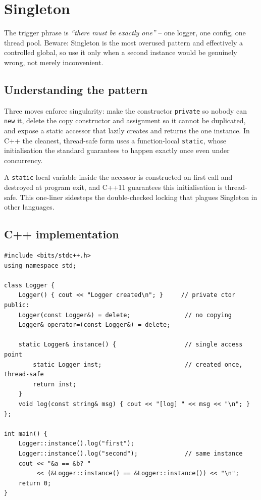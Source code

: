 \section{Singleton}
\label{sec:pat-singleton}


\begin{patternbox}
The trigger phrase is \emph{``there must be exactly one''} -- one logger,
one config, one thread pool. Beware: Singleton is the most overused
pattern and effectively a controlled global, so use it only when a second
instance would be genuinely wrong, not merely inconvenient.
\end{patternbox}

\subsection*{Understanding the pattern}

Three moves enforce singularity: make the constructor \texttt{private} so
nobody can \texttt{new} it, delete the copy constructor and assignment so
it cannot be duplicated, and expose a static accessor that lazily creates
and returns the one instance. In C++ the cleanest, thread-safe form uses a
function-local \texttt{static}, whose initialisation the standard
guarantees to happen exactly once even under concurrency.

\begin{ideabox}
A \texttt{static} local variable inside the accessor is constructed on
first call and destroyed at program exit, and C++11 guarantees this
initialisation is thread-safe. This one-liner sidesteps the double-checked
locking that plagues Singleton in other languages.
\end{ideabox}

\subsection*{C++ implementation}

\begin{lstlisting}
#include <bits/stdc++.h>
using namespace std;

class Logger {
    Logger() { cout << "Logger created\n"; }     // private ctor
public:
    Logger(const Logger&) = delete;               // no copying
    Logger& operator=(const Logger&) = delete;

    static Logger& instance() {                   // single access point
        static Logger inst;                       // created once, thread-safe
        return inst;
    }
    void log(const string& msg) { cout << "[log] " << msg << "\n"; }
};

int main() {
    Logger::instance().log("first");
    Logger::instance().log("second");             // same instance
    cout << "&a == &b? "
         << (&Logger::instance() == &Logger::instance()) << "\n";
    return 0;
}
\end{lstlisting}

